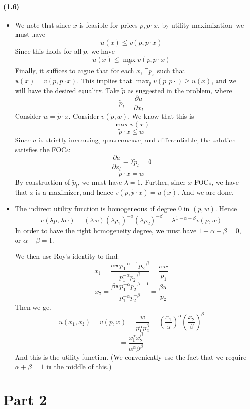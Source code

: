 \documentclass[10pt,letter]{article}
\begin{document}
\paragraph{(1.6)}
\begin{itemize}
\item We note that since $x$ is feasible for prices $p, p\cdot x$, by utility maximization, we must have
\[ u(x) \le v(p, p\cdot x) \]
Since this holds for all $p$, we have
\[ u(x) \le \max_p v(p, p\cdot x) \]
Finally, it suffices to argue that for each $x$, $\exists p_x$ such that $u(x) = v(p, p\cdot x)$. This implies that $\max_p v(p, p\cdot) \ge u(x)$, and we will have the desired equality. Take $\tilde{p}$ as suggested in the problem, where
\[ \tilde{p}_l = \frac{\partial u}{\partial x_l} \] Consider $w = \tilde{p} \cdot x$. Consider $v(\tilde{p},w)$. We know that this is
\[ \max u(x)  \]
\[ \tilde{p} \cdot x \le w \]
Since $u$ is strictly increasing, quasiconcave, and differentiable, the solution satisfies the FOCs:
\[ \frac{\partial u}{\partial x_l} - \lambda \tilde{p}_l = 0 \]
\[ \tilde{p} \cdot x = w \]
By construction of $\tilde{p}_l$, we must have $\lambda = 1$. Further, since $x$ FOCs, we have that $x$ is a maximizer, and hence $v(\tilde{p}, \tilde{p}\cdot x) = u(x)$. And we are done.
\item The indirect utility function is homogeneous of degree 0 in $(p,w)$. Hence
\[ v(\lambda p, \lambda w) = (\lambda w)(\lambda p_1)^{-\alpha}(\lambda p_2)^{-\beta} = \lambda ^{1-\alpha - \beta} v(p,w) \]
In order to have the right homogeneity degree, we must have $1 - \alpha - \beta = 0$, or $\alpha + \beta = 1$.

We then use Roy's identity to find:
\[ x_1 = \frac{\alpha w p_1^{-\alpha - 1}p_2^{-\beta}}{p_1^{-\alpha}p_2^{-\beta}} = \frac{\alpha w}{p_1} \]
\[ x_2 = \frac{\beta w p_1^{-\alpha}p_2^{-\beta-1}}{p_1^{-\alpha}p_2^{-\beta}} = \frac{\beta w}{p_2} \]
Then we get
\[ u(x_1, x_2) = v(p,w) = \frac{w}{p_1^{\alpha}p_2^{\beta}} = \left(\frac{x_1}{\alpha}\right)^\alpha\left(\frac{x_2}{\beta}\right)^\beta  \]
\[ = \frac{x_1^{\alpha} x_2^{\beta}}{\alpha^\alpha \beta^\beta} \]
And this is the utility function. (We conveniently use the fact that we require $\alpha + \beta = 1$ in the middle of this.)
\end{itemize}
\pagebreak
\section*{Part 2}
\end{document}
